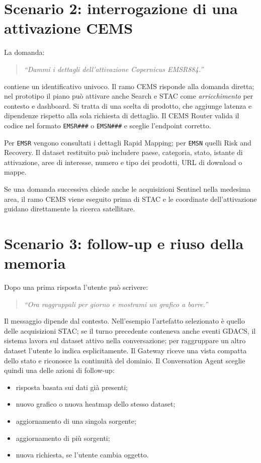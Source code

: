 \section{Scenario 2: interrogazione di una attivazione CEMS}

La domanda:

\begin{quote}
\emph{``Dammi i dettagli dell'attivazione Copernicus EMSR884.''}
\end{quote}

contiene un identificativo univoco. Il ramo CEMS risponde alla domanda
diretta; nel prototipo il piano può attivare anche Search e STAC come
\emph{arricchimento} per contesto e dashboard. Si tratta di una scelta di
prodotto, che aggiunge latenza e dipendenze rispetto alla sola richiesta di
dettaglio. Il CEMS Router valida il codice nel formato \texttt{EMSR\#\#\#} o
\texttt{EMSN\#\#\#} e sceglie l'endpoint corretto.

Per \texttt{EMSR} vengono consultati i dettagli Rapid Mapping; per
\texttt{EMSN} quelli Risk and Recovery. Il dataset restituito può includere
paese, categoria, stato, istante di attivazione, aree di interesse, numero e
tipo dei prodotti, URL di download o mappe.

Se una domanda successiva chiede anche le acquisizioni Sentinel nella medesima
area, il ramo CEMS viene eseguito prima di STAC e le coordinate
dell'attivazione guidano direttamente la ricerca satellitare.

\section{Scenario 3: follow-up e riuso della memoria}

Dopo una prima risposta l'utente può scrivere:

\begin{quote}
\emph{``Ora raggruppali per giorno e mostrami un grafico a barre.''}
\end{quote}

Il messaggio dipende dal contesto. Nell'esempio l'artefatto selezionato è
quello delle acquisizioni STAC; se il turno precedente conteneva anche eventi
GDACS, il sistema lavora sul dataset attivo nella conversazione; per
raggruppare un altro dataset l'utente lo indica esplicitamente. Il Gateway riceve una vista compatta dello stato e riconosce la
continuità del dominio. Il Conversation Agent sceglie quindi una delle azioni
di follow-up:

\begin{itemize}
    \item risposta basata sui dati già presenti;
    \item nuovo grafico o nuova heatmap dello stesso dataset;
    \item aggiornamento di una singola sorgente;
    \item aggiornamento di più sorgenti;
    \item nuova richiesta, se l'utente cambia oggetto.
\end{itemize}

